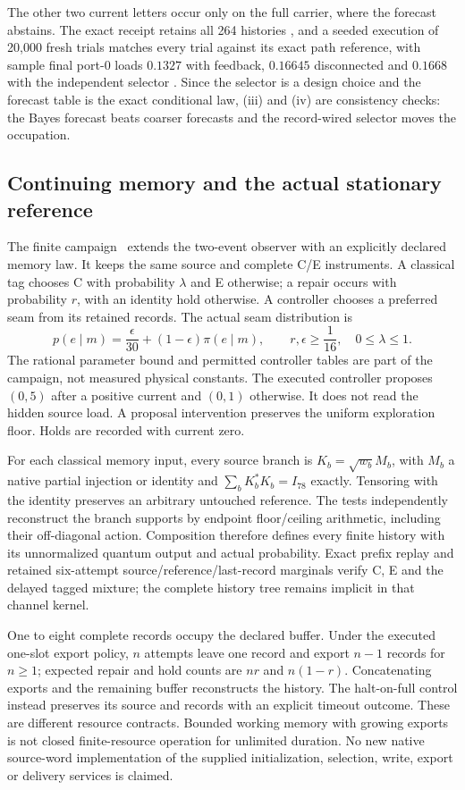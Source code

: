 \documentclass[11pt]{article}
\theoremstyle{definition}
\theoremstyle{remark}
\theoremstyle{plain}
\begin{document}
The other two current letters occur only on the full carrier, where the
forecast abstains. The exact receipt retains all 264 histories
\cite{rNATIVE}, and a seeded execution of 20,000 fresh trials matches every
trial against its exact path reference, with sample final port-0 loads
$0.1327$ with feedback, $0.16645$ disconnected and $0.1668$ with the
independent selector \cite{rRUN}. Since the selector is a design choice and
the forecast table is the exact conditional law, (iii) and (iv) are
consistency checks: the Bayes forecast beats coarser forecasts and the
record-wired selector moves the occupation.

\subsection{Continuing memory and the actual stationary reference}
\label{sec:finite-campaign}

The finite campaign~\cite{ophrepo} extends the
two-event observer with an explicitly declared memory law. It keeps the
same source and complete C/E instruments. A classical tag chooses C with
probability $\lambda$ and E otherwise; a repair occurs with probability $r$,
with an identity hold otherwise. A controller chooses a preferred seam from
its retained records. The actual seam distribution is
\[
 p(e\mid m)=\frac{\epsilon}{30}+(1-\epsilon)\pi(e\mid m),
 \qquad r,\epsilon\ge\frac1{16},\quad 0\le\lambda\le1.
\]
The rational parameter bound and permitted controller tables are part of the
campaign, not measured physical constants. The executed controller proposes
$(0,5)$ after a positive current and $(0,1)$ otherwise. It does not read the
hidden source load. A proposal intervention preserves the uniform exploration
floor. Holds are recorded with current zero.

For each classical memory input, every source branch is
$K_b=\sqrt{w_b}M_b$, with $M_b$ a native partial injection or identity and
$\sum_b K_b^*K_b=I_{78}$ exactly. Tensoring with the identity preserves an
arbitrary untouched reference. The tests independently reconstruct the branch
supports by endpoint floor/ceiling arithmetic, including their off-diagonal
action. Composition therefore defines every finite history with its
unnormalized quantum output and actual probability. Exact prefix replay
and retained six-attempt source/reference/last-record marginals verify C, E
and the delayed tagged mixture; the complete history tree remains implicit
in that channel kernel.

One to eight complete records occupy the declared buffer. Under the executed
one-slot export policy, $n$ attempts leave one record and export $n-1$ records
for $n\ge1$; expected repair and hold counts are $nr$ and $n(1-r)$.
Concatenating exports and the remaining buffer reconstructs the history.
The halt-on-full control instead preserves its source and records with an
explicit timeout outcome. These are different resource contracts. Bounded
working memory with growing exports is not closed finite-resource operation
for unlimited duration. No new native source-word implementation of the
supplied initialization, selection, write, export or delivery services is
claimed.
\end{document}
